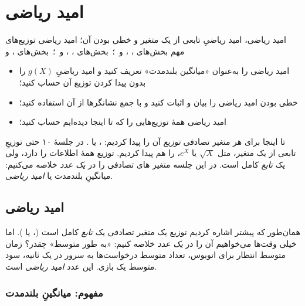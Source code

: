 \chapter{امید ریاضی}
\label{ch:s11}

{امید ریاضی، امید ریاضیِ تابعی از یک متغیر و خطی بودن آن؛ امید ریاضی توزیع‌های مهم}
{ بخش‌های ، ،  و  \,؛\,  بخش‌های ، ،  و  \,؛\,  بخش‌های ،  و }
{\begin{itemize}
    \item امید ریاضی را به‌عنوان «میانگین بلندمدت» تعریف کنید و امید ریاضیِ $g(X)$ را بدون پیدا کردن توزیع آن حساب کنید؛
    \item خطی بودن امید ریاضی را بیان و اثبات کنید و با جمع نشانگرها از آن استفاده کنید؛
    \item امید ریاضی همهٔ توزیع‌هایی را که تا اینجا دیده‌ایم حساب کنید؛
  \end{itemize}}

تا اینجا برای هر متغیر تصادفی \emph{توزیع} آن را پیدا کردیم: ،  یا . در جلسهٔ ۱۰ حتی توزیعِ تابعی از یک متغیر، مثل $\sqrt X$ یا $e^X$، را هم پیدا کردیم. توزیع همهٔ اطلاعات را دارد، ولی یک \emph{تابع} کامل است. در این جلسه متغیر های تصادفی را در \emph{یک عدد} خلاصه می‌کنیم: میانگینِ بلندمدت یا \emph{امید ریاضی}.

\section{امید ریاضی}
\label{sec:expect}

همان‌طور که پیشتر اشاره کردیم توزیع یک متغیر تصادفی یک \emph{تابع} کامل است (،  یا ). اما خیلی وقت‌ها می‌خواهیم آن را در \emph{یک عدد} خلاصه کنیم: «به طور متوسط» چقدر؟ زمان متوسط انتظار برای اتوبوس، تعداد متوسط درخواست‌ها به سرور در یک ثانیه، سود متوسط یک بازی. این عدد \emph{امید ریاضی} است.

\subsection{مفهوم: میانگینِ بلندمدت}

